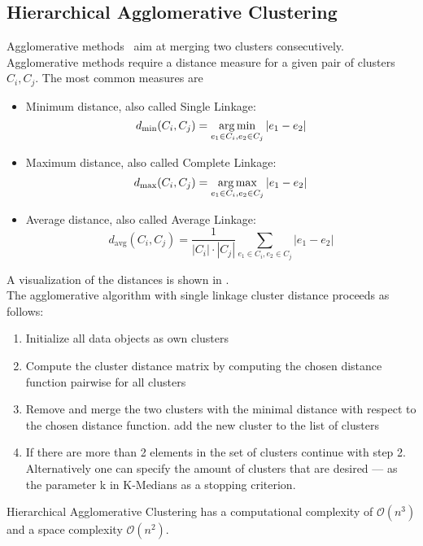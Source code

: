 \subsection{Hierarchical Agglomerative Clustering}\label{\positionnumber}
Agglomerative methods~\cite{mbs:/content/journal/micro/10.1099/00221287-17-1-201, wishart1969256, ward1963hierarchical} aim at merging two clusters consecutively. Agglomerative methods require a distance measure for a given pair of clusters $C_i ,C_j$. The most common measures are
\begin{itemize}
    \item Minimum distance, also called Single Linkage: 
    \[d_{\text{min}}(C_i, C_j) = \operatorname*{arg\,min}_{e_1 \in C_i, e_2 \in C_j} |e_1 - e_2|\]
    \item Maximum distance, also called Complete Linkage: 
    \[d_{\text{max}}(C_i, C_j) = \operatorname*{arg\,max}_{e_1 \in C_i, e_2 \in C_j} |e_1 - e_2|\]
    \item Average distance, also called Average Linkage: 
    \[d_{\text{avg}}(C_i, C_j) = \frac{1}{|C_i| \cdot |C_j|} \sum_{e_1 \in C_i, e_2 \in C_j} |e_1 - e_2|\]
\end{itemize}
A visualization of the distances is shown in .
 \\
The agglomerative algorithm with single linkage cluster distance proceeds as follows: 
\begin{enumerate}
    \item Initialize all data objects as own clusters
    \item Compute the cluster distance matrix by computing the chosen distance function pairwise for all clusters
    \item Remove and merge the two clusters with the minimal distance with respect to the chosen distance function. add the new cluster to the list of clusters
    \item If there are more than 2 elements in the set of clusters continue with step 2. Alternatively one can specify the amount of clusters that are desired --- as the parameter k in K-Medians as a stopping criterion. 
\end{enumerate}
Hierarchical Agglomerative Clustering has a computational complexity of $\mathcal{O}(n^3)$ and a space complexity $\mathcal{O}(n^2)$. 



